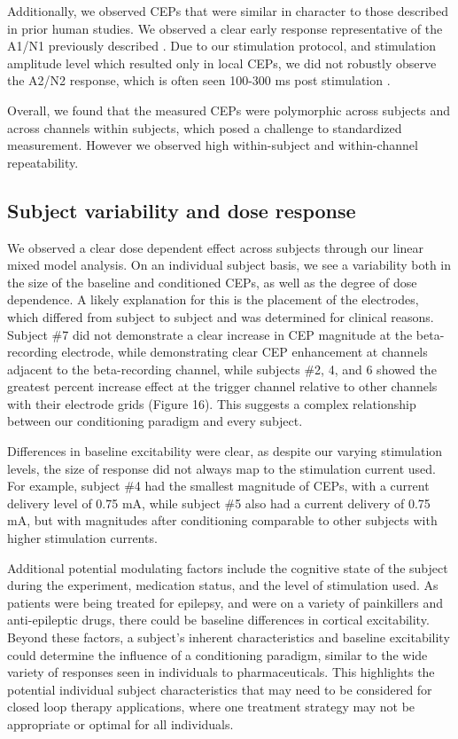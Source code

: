 Additionally, we observed CEPs that were similar in character to those described in prior human studies. We observed a clear early response representative of the A1/N1 previously described \cite{Matsumoto2006a,Matsumoto2012,Keller2014e}. Due to our stimulation protocol, and stimulation amplitude level which resulted only in local CEPs, we did not robustly observe the A2/N2 response, which is often seen 100-300 ms post stimulation \cite{Keller2014e}. 

Overall, we found that the measured CEPs were polymorphic across subjects and across channels within subjects, which posed a challenge to standardized measurement. However we observed high within-subject and within-channel repeatability. 

\subsection{Subject variability and dose response}
We observed a clear dose dependent effect across subjects through our linear mixed model analysis. On an individual subject basis, we see a variability both in the size of the baseline and conditioned CEPs, as well as the degree of dose dependence. A likely explanation for this is the placement of the electrodes, which differed from subject to subject and was determined for clinical reasons. Subject \#7 did not demonstrate a clear increase in CEP magnitude at the beta-recording electrode, while demonstrating clear CEP enhancement at channels adjacent to the beta-recording channel, while subjects \#2, 4, and 6 showed the greatest percent increase effect at the trigger channel relative to other channels with their electrode grids (Figure 16). This suggests a complex relationship between our conditioning paradigm and every subject.

Differences in baseline excitability were clear, as despite our varying stimulation levels, the size of response did not always map to the stimulation current used. For example, subject \#4 had the smallest magnitude of CEPs, with a current delivery level of 0.75 mA, while subject \#5 also had a current delivery of 0.75 mA, but with magnitudes after conditioning comparable to other subjects with higher stimulation currents.

Additional potential modulating factors include the cognitive state of the subject during the experiment, medication status, and the level of stimulation used. As patients were being treated for epilepsy, and were on a variety of painkillers and anti-epileptic drugs, there could be baseline differences in cortical excitability. Beyond these factors, a subject’s inherent characteristics and baseline excitability could determine the influence of a conditioning paradigm, similar to the wide variety of responses seen in individuals to pharmaceuticals. This highlights the potential individual subject characteristics that may need to be considered for closed loop therapy applications, where one treatment strategy may not be appropriate or optimal for all individuals. 

